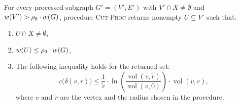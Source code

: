 

\begin{theorem}
For every processed subgraph $G'=(V',E')$ with $V'\cap X\neq\emptyset$ and
$w\mathopen{}\left( V' \right)>\rho_0\cdot w\mathopen{}\left( G \right)$, procedure \textsc{Cut-Proc} returns
nonempty $U\subsetneq V'$ such that:
\begin{enumerate}
    \item $U\cap X\neq\emptyset$,
    \item $w\mathopen{}\left( U \right)\le \rho_0\cdot w\mathopen{}\left( G \right)$,
    \item The following inequality holds for the returned set:
\begin{equation}
c\bigl(\delta(v,r)\bigr)
\le
\frac{1}{\tilde r}\cdot\ln\left(\frac{\operatorname{vol}(v,\tilde r)}{\operatorname{vol}(v,0)}\right)
\cdot \operatorname{vol}(v,r),
\label{eq:terminal-good-radius}
\end{equation}
where $v$ and $\tilde r$ are the vertex and the radius chosen in the procedure. 
\end{enumerate}
\end{theorem}

